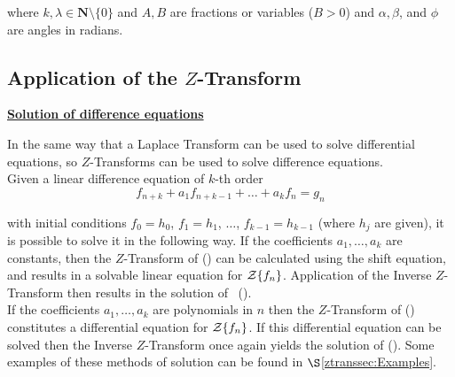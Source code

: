where $k,\lambda \in \mathbf{N} \setminus \{0\}$ and $A,B$ are fractions or
variables ($B>0$) and $\alpha,\beta$, and $\phi$ are angles in
radians.

\subsection[Application of the Z-Transform]{Application of the $Z$-Transform}
\underline {{\bf Solution of difference equations}}

  In the same way that a Laplace Transform can be used to
  solve differential equations, so $Z$-Transforms can be used
  to solve difference equations.\\
  Given a linear difference equation of $k$-th order
\begin{equation}
  f_{n+k} + a_1 f_{n+k-1}+ \ldots + a_k f_n = g_n
\label{eq:1}
\end{equation}

  with initial conditions
  $f_0 = h_0$, $f_1 = h_1$, $\ldots$, $f_{k-1} = h_{k-1}$ (where $h_j$
  are given), it is possible to solve it in the following way.
   If the coefficients $a_1, \ldots , a_k$ are constants, then the
  $Z$-Transform of () can be calculated using the shift
  equation, and results in a solvable linear equation for
  ${\cal Z} \{f_n\}$. Application of the Inverse $Z$-Transform
  then results in the solution of \ ().\\
  If the coefficients $a_1, \ldots , a_k$ are polynomials in $n$ then
  the $Z$-Transform of () constitutes a differential
  equation for ${\cal Z} \{f_n\}$. If this differential equation can
  be solved then the Inverse $Z$-Transform once again yields the
  solution of ().
  Some examples of these methods of solution can be found in
  $\S$\ref{ztranssec:Examples}.

